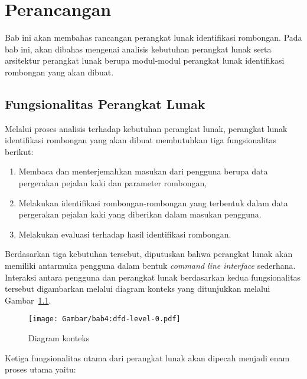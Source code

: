 \chapter{Perancangan}
\label{chap:perancangan}

Bab ini akan membahas rancangan perangkat lunak identifikasi rombongan. Pada bab ini, akan dibahas mengenai analisis kebutuhan perangkat lunak serta arsitektur perangkat lunak berupa modul-modul perangkat lunak identifikasi rombongan yang akan dibuat.

\section{Fungsionalitas Perangkat Lunak}
\label{sec:functionality}

Melalui proses analisis terhadap kebutuhan perangkat lunak, perangkat lunak identifikasi rombongan yang akan dibuat membutuhkan tiga fungsionalitas berikut:

\begin{enumerate}
    \item Membaca dan menterjemahkan masukan dari pengguna berupa data pergerakan pejalan kaki dan parameter rombongan,
    \item Melakukan identifikasi rombongan-rombongan yang terbentuk dalam data pergerakan pejalan kaki yang diberikan dalam masukan pengguna.
    \item Melakukan evaluasi terhadap hasil identifikasi rombongan.
\end{enumerate}

Berdasarkan tiga kebutuhan tersebut, diputuskan bahwa perangkat lunak akan memiliki antarmuka pengguna dalam bentuk \textit{command line interface} sederhana. Interaksi antara pengguna dan perangkat lunak berdasarkan kedua fungsionalitas tersebut digambarkan melalui diagram konteks yang ditunjukkan melalui Gambar~\ref{bab4:context-diagram}.

\begin{figure}[h]
    \centering
    \texttt{[image: Gambar/bab4:dfd-level-0.pdf]}
    \caption{Diagram konteks}
    \label{bab4:context-diagram}
\end{figure}

\noindent Ketiga fungsionalitas utama dari perangkat lunak akan dipecah menjadi enam proses utama yaitu:

